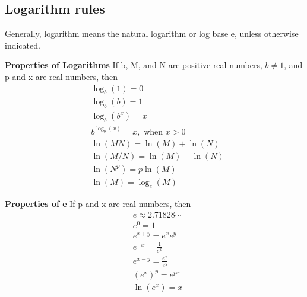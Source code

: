 \documentclass[14pt]{extarticle}
\begin{document}
\subsection{Logarithm rules}
Generally, logarithm means the natural logarithm or log base e, unless otherwise indicated.
\begin{tcolorbox}[enhanced jigsaw,colback=bg,boxrule=0pt,arc=0pt]
	\textbf{Properties of Logarithms} If b, M, and N are positive real numbers, $b \neq 1$, and p and x are real numbers, then
	\begin{align}
		&\log_b(1)=0 \\
		&\log_b(b)=1 \\
		&\log_b(b^x)=x \\
		&b^{\log_b(x)}=x, \text{ when }x> 0 \\
		&\ln(MN) = \ln(M) + \ln(N) \\ 
		&\ln(M/N)=\ln(M)-\ln(N) \\
		&\ln(N^p)= p\ln(M) \\ 
		&\ln(M) = \log_e(M)
	\end{align}
\end{tcolorbox}
\begin{tcolorbox}[enhanced jigsaw,colback=bg,boxrule=0pt,arc=0pt]
	\textbf{Properties of e} If p and x are real numbers, then
	\begin{align}
		&e \approx 2.71828 \cdots \\
		&e^0 = 1 \\
		&e^{x+y} = e^x e^y  \\
		&e^{-x}=\frac{1}{e^x} \\
		&e^{x-y} = \frac{e^x}{e^y } \\ 
		&(e^x)^p= e^{px} \\
		&\ln(e^x) = x 
	\end{align}
\end{tcolorbox}
\end{document}
